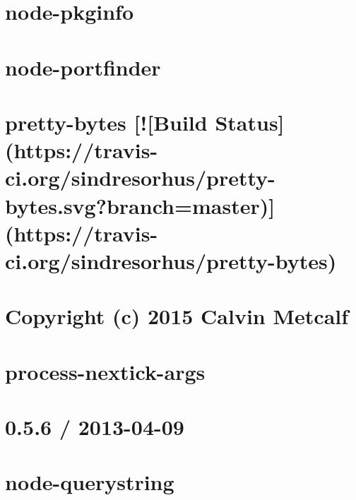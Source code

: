 \documentclass[twoside]{book}
\newcommand{\+}{\discretionary{\mbox{\scriptsize$\hookleftarrow$}}{}{}}
\begin{document}
\chapter{node-\/pkginfo}
\label{md_app_web_node_modules_pkginfo__r_e_a_d_m_e}

\chapter{node-\/portfinder}
\label{md_app_web_node_modules_portfinder__r_e_a_d_m_e}

\chapter{pretty-\/bytes \mbox{[}!\mbox{[}Build Status\mbox{]}(https\+://travis-\/ci.org/sindresorhus/pretty-\/bytes.svg?branch=master)\mbox{]}(https\+://travis-\/ci.org/sindresorhus/pretty-\/bytes)}
\label{md_app_web_node_modules_pretty-bytes_readme}

\chapter{Copyright (c) 2015 Calvin Metcalf}
\label{md_app_web_node_modules_process-nextick-args_license}

\chapter{process-\/nextick-\/args}
\label{md_app_web_node_modules_process-nextick-args_readme}

\chapter{0.5.6 / 2013-\/04-\/09}
\label{md_app_web_node_modules_qs__history}

\chapter{node-\/querystring}
\label{md_app_web_node_modules_qs__readme}

\end{document}
